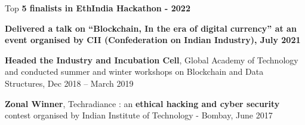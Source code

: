 \begin{zitemize}
\item Top \textbf{5 finalists in EthIndia Hackathon - 2022}
\item \textbf{Delivered a talk on “Blockchain, In the era of digital currency” at an event organised by CII (Confederation on Indian Industry), July 2021}
\item \textbf{Headed the Industry and Incubation Cell}, Global Academy of Technology and conducted summer and winter workshops on Blockchain and Data Structures, Dec 2018 – March 2019
\item \textbf{Zonal Winner}, Techradiance : an \textbf{ethical hacking and cyber security} contest organised by Indian Institute of Technology - Bombay, June 2017
\end{zitemize}
